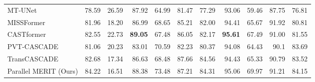 \documentclass{midl}
\begin{document}
\begin{table*}[t]
{\begin{adjustbox}{width=1\textwidth}
{\begin{tabular}{lrrrrrrrrrr}
MT-UNet \cite{wang2022mixed}                      & 78.59                    & 26.59                    & 87.92                                      & 64.99                                   & 81.47                                        & 77.29                                        & 93.06                                     & 59.46                                  & 87.75                                   & 76.81                                  \\
MISSFormer \cite{huang2021missformer}                      & 81.96                    & 18.20                    & 86.99                                      &  68.65                                   &  85.21                                        & 82.00                                        & 94.41                                      & 65.67                                   & 91.92                                   & 80.81                                   \\        
CASTformer \cite{you2022class}                      & 82.55                    & 22.73                    & \textbf{89.05}                                      &  67.48                                   & 86.05                                       & 82.17                                        & \textbf{95.61}                                      & 67.49                                   & 91.00                                   & 81.55                                   \\
PVT-CASCADE \cite{rahman2023medical}                  & 81.06                    & 20.23                   & 83.01                                      & 70.59                                   & 82.23                                        & 80.37                                        & 94.08                                      & 64.43                                   & 90.1                                    & 83.69                                   \\ TransCASCADE \cite{rahman2023medical}                 & 82.68                    & 17.34                    & 86.63                                      & 68.48                                   & 87.66                                        & 84.56                                        & 94.43                                      & 65.33                                   & 90.79                                   & 83.52                                   \\
\midrule
Parallel MERIT (Ours)                   & 84.22                    & 16.51                    & 88.38                                      & 73.48                                  & 87.21                                        & 84.31                                        & 95.06                                      & 69.97                                   & 91.21                                    & 84.15                                   \\

\end{tabular}}
\end{adjustbox}}
\end{table*}
\end{document}
